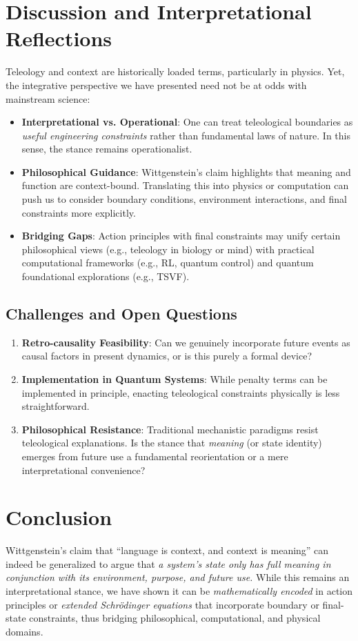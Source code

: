 \documentclass[11pt]{article}
\begin{document}
\section{Discussion and Interpretational Reflections}
\label{sec:discussion}
Teleology and context are historically loaded terms, particularly in physics. Yet, the integrative perspective we have presented need not be at odds with mainstream science:
\begin{itemize}
    \item \textbf{Interpretational vs. Operational}: One can treat teleological boundaries as \emph{useful engineering constraints} rather than fundamental laws of nature. In this sense, the stance remains operationalist.
    \item \textbf{Philosophical Guidance}: Wittgenstein's claim highlights that meaning and function are context-bound. Translating this into physics or computation can push us to consider boundary conditions, environment interactions, and final constraints more explicitly.
    \item \textbf{Bridging Gaps}: Action principles with final constraints may unify certain philosophical views (e.g., teleology in biology or mind) with practical computational frameworks (e.g., RL, quantum control) and quantum foundational explorations (e.g., TSVF).
\end{itemize}

\subsection{Challenges and Open Questions}
\begin{enumerate}
    \item \textbf{Retro-causality Feasibility}: Can we genuinely incorporate future events as causal factors in present dynamics, or is this purely a formal device?
    \item \textbf{Implementation in Quantum Systems}: While penalty terms can be implemented in principle, enacting teleological constraints physically is less straightforward.
    \item \textbf{Philosophical Resistance}: Traditional mechanistic paradigms resist teleological explanations. Is the stance that \emph{meaning} (or state identity) emerges from future use a fundamental reorientation or a mere interpretational convenience?
\end{enumerate}

\section{Conclusion}
\label{sec:conclusion}
Wittgenstein’s claim that ``language is context, and context is meaning'' can indeed be generalized to argue that \emph{a system’s state only has full meaning in conjunction with its environment, purpose, and future use.} While this remains an interpretational stance, we have shown it can be \emph{mathematically encoded} in action principles or \emph{extended Schr\"odinger equations} that incorporate boundary or final-state constraints, thus bridging philosophical, computational, and physical domains.
\end{document}
